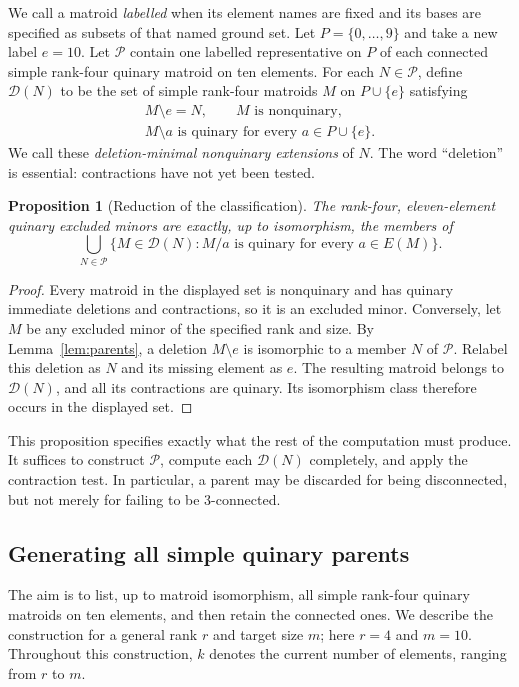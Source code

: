 \documentclass[11pt,a4paper]{article}
\newtheorem{proposition}[theorem]{Proposition}
\theoremstyle{definition}
\begin{document}
We call a matroid \emph{labelled} when its element names are fixed
and its bases are specified as subsets of that named ground set.
Let $P=\{0,\ldots,9\}$ and take a new label $e=10$. Let
$\mathcal P$ contain one labelled representative on $P$ of each
connected simple rank-four quinary matroid on ten elements. For each
$N\in\mathcal P$, define $\mathcal D(N)$ to be the set of simple
rank-four matroids $M$ on $P\cup\{e\}$ satisfying
\[
 \begin{gathered}
 M\setminus e=N,\qquad M\text{ is nonquinary},\\
 M\setminus a\text{ is quinary for every }a\in P\cup\{e\}.
 \end{gathered}
\]
We call these \emph{deletion-minimal nonquinary extensions} of $N$.
The word ``deletion'' is essential: contractions have not yet been
tested.

\begin{proposition}[Reduction of the classification]\label{prop:reduction}
The rank-four, eleven-element quinary excluded minors are exactly,
up to isomorphism, the members of
\[
 \bigcup_{N\in\mathcal P}
 \{M\in\mathcal D(N):M/a\text{ is quinary for every }a\in E(M)\}.
\]
\end{proposition}
\begin{proof}
Every matroid in the displayed set is nonquinary and has quinary
immediate deletions and contractions, so it is an excluded minor.
Conversely, let $M$ be any excluded minor of the specified rank and
size. By Lemma~\ref{lem:parents}, a deletion $M\setminus e$ is
isomorphic to a member $N$ of $\mathcal P$. Relabel this deletion as
$N$ and its missing element as $e$. The resulting matroid belongs
to $\mathcal D(N)$, and all its contractions are quinary. Its
isomorphism class therefore occurs in the displayed set.
\end{proof}

This proposition specifies exactly what the rest of the computation
must produce. It suffices to construct $\mathcal P$, compute each
$\mathcal D(N)$ completely, and apply the contraction test. In
particular, a parent may be discarded for being disconnected, but
not merely for failing to be 3-connected.

\subsection{Generating all simple quinary parents}

The aim is to list, up to matroid isomorphism, all simple rank-four
quinary matroids on ten elements, and then retain the connected
ones. We describe the construction for a general rank $r$ and target
size $m$; here $r=4$ and $m=10$. Throughout this construction, $k$
denotes the current number of elements, ranging from $r$ to $m$.
\end{document}
